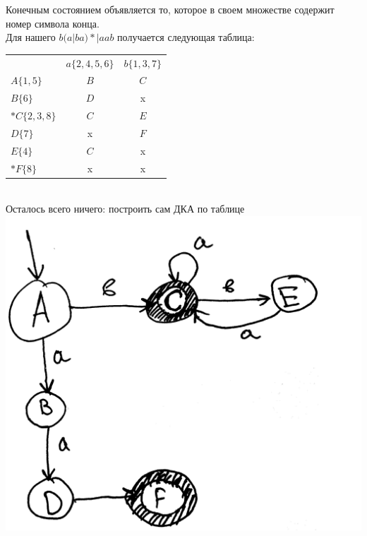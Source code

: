 \documentclass[14pt]{extreport}
\begin{document}
	Конечным состоянием объявляется то, которое в своем множестве содержит номер символа конца.\\
	\newpage
	Для нашего $b(a|ba)*|aab$ получается следующая таблица:\\
		\begin{tabular}{lcc}
			 & $a\{2, 4, 5, 6\}$ & $b\{1, 3, 7\}$ \\
			 $A\{1, 5\}$ & $B$ & $C$ \\
			 $B\{6\}$ & $D$ & x \\
			 $*C\{2, 3, 8\}$ & $C$ & $E$ \\
			 $D\{7\}$ & x & $F$ \\
			 $E\{4\}$ & $C$ & x \\
			 $*F\{8\}$ & x & x \\
		\end{tabular}\\
	Осталось всего ничего: построить сам ДКА по таблице\\
	\includegraphics[scale=0.11]{data/pic3_3.png}\\
\end{document}
